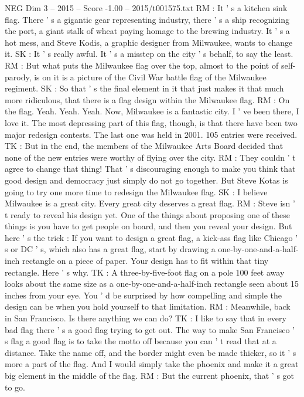 \begin{textsample}{NEG Dim 3 – 2015 – Score -1.00 – 2015/t001575.txt}
RM : It ' s a kitchen sink flag.
There ' s a gigantic gear representing industry, there ' s a ship recognizing the port, a giant stalk of wheat paying homage to the brewing industry.
It ' s a hot mess, and Steve Kodis, a graphic designer from Milwaukee, wants to change it.
SK : It ' s really awful.
It ' s a misstep on the city ' s behalf, to say the least.
RM : But what puts the Milwaukee flag over the top, almost to the point of self- parody, is on it is a picture of the Civil War battle flag of the Milwaukee regiment.
SK : So that ' s the final element in it that just makes it that much more ridiculous, that there is a flag design within the Milwaukee flag.
RM : On the flag.
Yeah.
Yeah.
Yeah.
Now, Milwaukee is a fantastic city.
I ' ve been there, I love it.
The most depressing part of this flag, though, is that there have been two major redesign contests.
The last one was held in 2001. 105 entries were received.
TK : But in the end, the members of the Milwaukee Arts Board decided that none of the new entries were worthy of flying over the city.
RM : They couldn ' t agree to change that thing!
That ' s discouraging enough to make you think that good design and democracy just simply do not go together.
But Steve Kotas is going to try one more time to redesign the Milwaukee flag.
SK : I believe Milwaukee is a great city.
Every great city deserves a great flag.
RM : Steve isn ' t ready to reveal his design yet.
One of the things about proposing one of these things is you have to get people on board, and then you reveal your design.
But here ' s the trick : If you want to design a great flag, a kick-ass flag like Chicago ' s or DC ' s, which also has a great flag, start by drawing a one-by-one-and-a-half-inch rectangle on a piece of paper.
Your design has to fit within that tiny rectangle.
Here ' s why.
TK : A three-by-five-foot flag on a pole 100 feet away looks about the same size as a one-by-one-and-a-half-inch rectangle seen about 15 inches from your eye.
You ' d be surprised by how compelling and simple the design can be when you hold yourself to that limitation.
RM : Meanwhile, back in San Francisco.
Is there anything we can do?
TK : I like to say that in every bad flag there ' s a good flag trying to get out.
The way to make San Francisco ' s flag a good flag is to take the motto off because you can ' t read that at a distance.
Take the name off, and the border might even be made thicker, so it ' s more a part of the flag.
And I would simply take the phoenix and make it a great big element in the middle of the flag.
RM : But the current phoenix, that ' s got to go.

\end{textsample}
